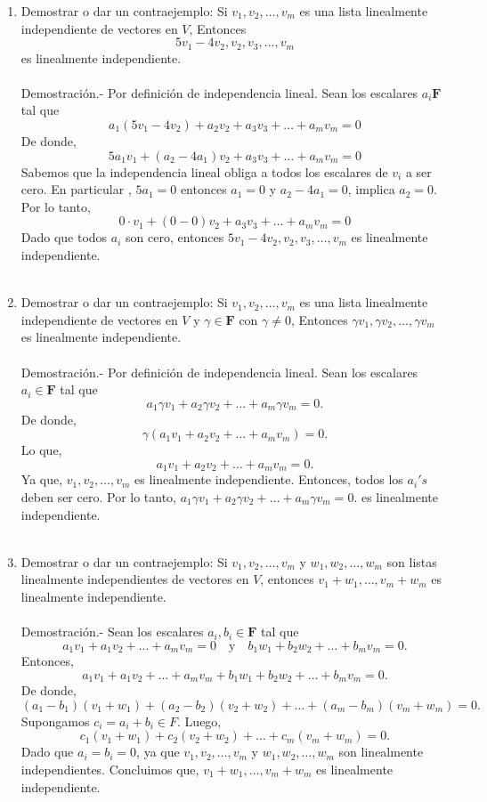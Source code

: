 \begin{enumerate}[\bfseries 1.]
    \item Demostrar o dar un contraejemplo: Si $v_1,v_2,\ldots,v_m$ es una lista linealmente independiente  de vectores en $V$, Entonces
    $$5v_1-4v_2,v_2,v_3,\ldots,v_m$$
    es linealmente independiente.\\\\
	Demostración.-\; Por definición de independencia lineal. Sean los escalares $a_i\textbf{F}$ tal que 
	$$a_1(5v_1-4v_2)+a_2v_2+a_3v_3+\ldots+a_mv_m=0$$
	De donde,
	$$5a_1v_1+(a_2-4a_1)v_2+a_3v_3+\ldots+a_m v_m=0$$
	Sabemos que la independencia lineal obliga a todos los escalares de $v_i$ a ser cero. En particular , $5a_1=0$ entonces $a_1=0$ y $a_2-4a_1=0$, implica $a_2=0.$ Por lo tanto, 
	$$0\cdot v_1+(0-0)v_2+a_3v_3+\ldots+a_m v_m=0$$
	Dado que todos $a_i$ son cero, entonces $5v_1-4v_2,v_2,v_3,\ldots,v_m$ es linealmente independiente.\\\\

    \item Demostrar o dar un contraejemplo: Si $v_1,v_2,\ldots,v_m$ es una lista linealmente independiente  de vectores en $V$ y $\gamma\in \textbf{F}$ con $\gamma\neq 0$, Entonces $\gamma v_1,\gamma v_2,\ldots,\gamma v_m$ es linealmente independiente.\\\\
	Demostración.-\; Por definición de independencia lineal. Sean los escalares $a_i\in \textbf{F}$ tal que
	$$a_1\gamma v_1+a_2\gamma v_2+\ldots+a_m\gamma v_m=0.$$
	De donde,
	$$\gamma\left(a_1 v_1+a_2 v_2+\ldots+a_m v_m\right)=0.$$
	Lo que,
	$$a_1 v_1+a_2 v_2+\ldots+a_m v_m=0.$$
	Ya que, $v_1,v_2,\ldots,v_m$ es linealmente independiente. Entonces, todos los $a_i's$ deben ser cero. Por lo tanto, $a_1\gamma v_1+a_2\gamma v_2+\ldots+a_m\gamma v_m=0.$ es linealmente independiente.\\\\

    \item Demostrar o dar un contraejemplo: Si $v_1,v_2,\ldots,v_m$ y $w_1,w_2,\ldots,w_m$ son listas linealmente independientes de vectores en $V$, entonces $v_1+w_1,\ldots,v_m+w_m$ es linealmente independiente.\\\\
	Demostración.-\; Sean los escalares $a_i,b_i\in \textbf{F}$ tal que
	$$a_1v_1+a_1v_2+\ldots+a_mv_m=0\quad \mbox{y}\quad b_1w_1+b_2w_2+\ldots+b_mv_m=0.$$
	Entonces,
	$$a_1v_1+a_1v_2+\ldots+a_mv_m+b_1w_1+b_2w_2+\ldots+b_mv_m=0.$$
	De donde,
	$$(a_1-b_1)(v_1+w_1)+(a_2-b_2)(v_2+w_2)+\ldots+(a_m-b_m)(v_m+w_m)=0.$$
	Supongamos $c_i=a_i+b_i\in F$. Luego,
	$$c_1(v_1+w_1)+c_2(v_2+w_2)+\ldots+c_m(v_m+w_m)=0.$$
	Dado que $a_i=b_i=0$, ya que $v_1,v_2,\ldots,v_m$ y $w_1,w_2,\ldots,w_m$ son linealmente independientes. Concluimos que, $v_1+w_1,\ldots,v_m+w_m$ es linealmente independiente.\\\\


\end{enumerate}
